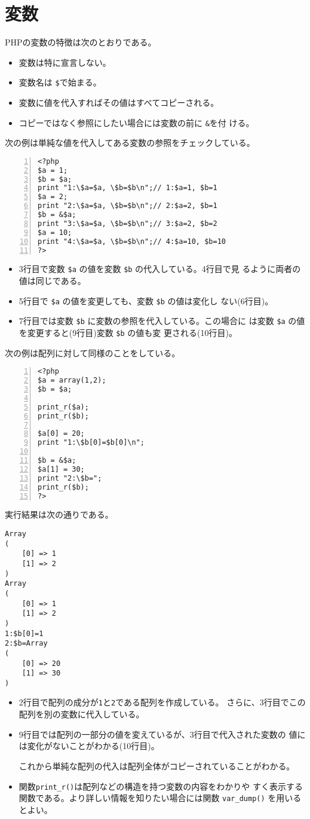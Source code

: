 \section{変数}
PHPの変数の特徴は次のとおりである。
\begin{itemize}
 \item 変数は特に宣言しない。
 \item 変数名は \texttt{\$}で始まる。
 \item 変数に値を代入すればその値はすべてコピーされる。
 \item コピーではなく参照にしたい場合には変数の前に \texttt{\&}を付
ける。
\end{itemize}
\begin{Exec}\upshape\label{PHPsubstitute}
次の例は単純な値を代入してある変数の参照をチェックしている。
\begin{Verbatim}[numbers=left]
<?php
$a = 1;
$b = $a;
print "1:\$a=$a, \$b=$b\n";// 1:$a=1, $b=1
$a = 2;
print "2:\$a=$a, \$b=$b\n";// 2:$a=2, $b=1
$b = &$a;
print "3:\$a=$a, \$b=$b\n";// 3:$a=2, $b=2
$a = 10;
print "4:\$a=$a, \$b=$b\n";// 4:$a=10, $b=10
?>
\end{Verbatim}
 \begin{itemize}
  \item 3行目で変数 \Verb+$a+ の値を変数 \Verb+$b+ の代入している。4行目で見
        るように両者の値は同じである。
  \item 5行目で \Verb+$a+ の値を変更しても、変数 \Verb+$b+ の値は変化し
        ない(6行目)。
  \item 7行目では変数 \Verb+$b+ に変数の参照を代入している。この場合に
        は変数 \Verb+$a+ の値を変更すると(9行目)変数 \Verb+$b+ の値も変
        更される(10行目)。
 \end{itemize}
 次の例は配列に対して同様のことをしている。
\begin{Verbatim}[numbers=left]
<?php
$a = array(1,2);
$b = $a;

print_r($a);
print_r($b);

$a[0] = 20;
print "1:\$b[0]=$b[0]\n";

$b = &$a;
$a[1] = 30;
print "2:\$b=";
print_r($b);
?>
\end{Verbatim}
実行結果は次の通りである。
\begin{Verbatim}
Array
(
    [0] => 1
    [1] => 2
)
Array
(
    [0] => 1
    [1] => 2
)
1:$b[0]=1
2:$b=Array
(
    [0] => 20
    [1] => 30
)

\end{Verbatim}
\begin{itemize}
 \item 2行目で配列の成分が\texttt{1}と\texttt{2}である配列を作成している。
       さらに、3行目でこの配列を別の変数に代入している。
 \item 9行目では配列の一部分の値を変えているが、3行目で代入された変数の
       値には変化がないことがわかる(10行目)。

       これから単純な配列の代入は配列全体がコピーされていることがわかる。
 \item 関数\texttt{print\_r()}は配列などの構造を持つ変数の内容をわかりや
 すく表示する関数である。より詳しい情報を知りたい場合には関数
       \Verb+var_dump()+ を用いるとよい。
\end{itemize}
\end{Exec}
